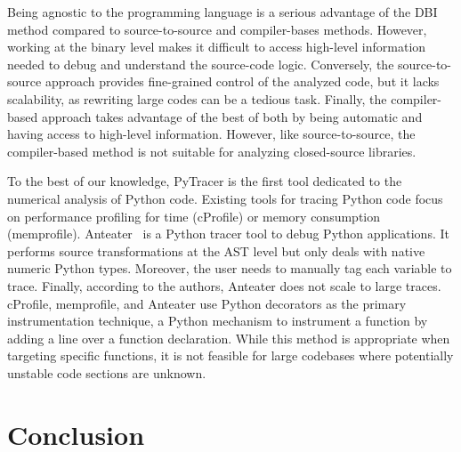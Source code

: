 \documentclass[10pt,journal,compsoc]{IEEEtran}
\newcommand{\pytracer}[0]{PyTracer\xspace}
\begin{document}
Being agnostic to the programming language is a serious advantage of the DBI
method compared to source-to-source and compiler-bases methods. However, working
at the binary level makes it difficult to access high-level information needed
to debug and understand the source-code logic. Conversely, the source-to-source
approach provides fine-grained control of the analyzed code, but it lacks
scalability, as rewriting large codes can be a tedious task. Finally, the
compiler-based approach takes advantage of the best of both by being automatic
and having access to high-level information. However, like source-to-source, the
compiler-based method is not suitable for analyzing closed-source libraries.

To the best of our knowledge, \pytracer is the first tool dedicated to the
numerical analysis of Python code. Existing tools for tracing Python code focus
on performance profiling for time (cProfile) or memory consumption (memprofile).
Anteater~\cite{faust2019anteater} is a Python tracer tool to debug Python
applications. It performs source transformations at the AST level but only deals
with native numeric Python types. Moreover, the user needs to manually tag each
variable to trace. Finally, according to the authors, Anteater does not scale to
large traces. cProfile, memprofile, and Anteater use Python decorators as the
primary instrumentation technique, a Python mechanism to instrument a function
by adding a line over a function declaration. While this method is appropriate
when targeting specific functions, it is not feasible for large codebases where
potentially unstable code sections are unknown.



\section{Conclusion}


\end{document}
